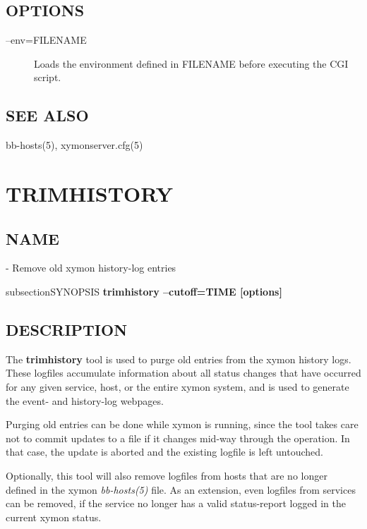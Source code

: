  
\subsection{OPTIONS}
\begin{description}
\item[--env=FILENAME] Loads the environment defined in FILENAME before executing the CGI script. 


\end{description}
\subsection{SEE ALSO}
bb-hosts(5), xymonserver.cfg(5) 

 

%
\newpage
\section{TRIMHISTORY}
\subsection{NAME}
  - Remove old xymon history-log entries 

subsection{SYNOPSIS}
\textbf{trimhistory --cutoff=TIME [options]}


 
\subsection{DESCRIPTION}
 The \textbf{trimhistory}
 tool is used to purge old entries from the xymon history logs. These
 logfiles accumulate information about all status changes that have
 occurred for any given service, host, or the entire xymon system,
 and is used to generate the event- and history-log webpages. 


  Purging old entries can be done while xymon is running, since the
  tool takes care not to commit updates to a file if it changes
  mid-way through the operation. In that case, the update is aborted
  and the existing logfile is left untouched. 


  Optionally, this tool will also remove logfiles from hosts that are
  no longer defined in the xymon \emph{bb-hosts(5)} file. As an
  extension, even logfiles from services can be removed, if the
  service no longer has a valid status-report logged in the current
  xymon status. 

